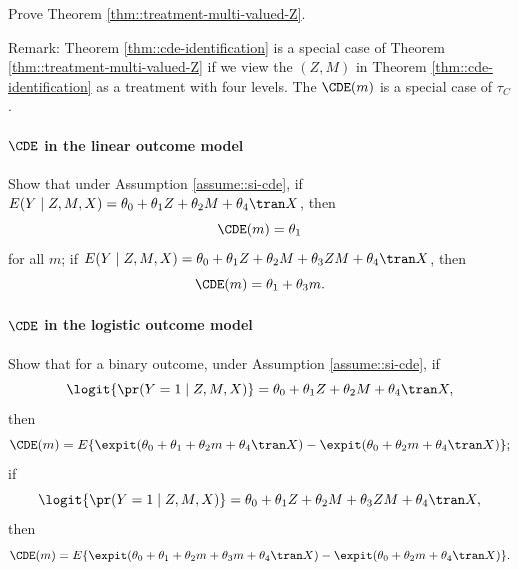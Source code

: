Prove Theorem \ref{thm::treatment-multi-valued-Z}.


Remark: Theorem \ref{thm::cde-identification} is a special case of Theorem \ref{thm::treatment-multi-valued-Z} if we view the $(Z,M)$ in Theorem \ref{thm::cde-identification} as a treatment with four levels. The $  \CDE (m) $ is a special case of $\tau_C $. 


  
  \paragraph{$\CDE$ in the linear outcome model}\label{problem::cde-linear}
  
  Show that under Assumption \ref{assume::si-cde}, if $E(Y\mid Z, M, X ) = \theta_0 + \theta_1 Z + \theta_2 M +   \theta_4\tran X$, then
  $$
  \CDE (m) = \theta_1
  $$
  for all $m$;
  if $E(Y\mid Z, M, X ) = \theta_0 + \theta_1 Z + \theta_2 M + \theta_3 ZM +    \theta_4\tran X$, then
  $$
\CDE(m) =   \theta_1 + \theta_3 m. 
  $$
  
  
    \paragraph{$\CDE$ in the logistic outcome model}\label{problem::cde-logit}
  
  Show that for a binary outcome, under Assumption \ref{assume::si-cde}, if 
  $$
  \logit \{ \pr(Y = 1\mid Z, M, X ) \} = \theta_0 + \theta_1 Z + \theta_2 M +   \theta_4\tran X ,
  $$ 
  then
  $$
  \CDE (m) = E\{ \expit( \theta_0 + \theta_1  + \theta_2 m +   \theta_4\tran X ) - \expit( \theta_0    + \theta_2 m +   \theta_4\tran X ) \} ; 
  $$
  if 
  $$
  \logit \{ \pr(Y = 1\mid Z, M, X ) \} = \theta_0 + \theta_1 Z + \theta_2 M + \theta_3 ZM +    \theta_4\tran X,
  $$ 
  then
  $$
\CDE(m) =  E\{ \expit( \theta_0 + \theta_1  + \theta_2 m  +\theta_3 m +   \theta_4\tran X ) - \expit( \theta_0    + \theta_2 m +   \theta_4\tran X ) \}.
  $$
  
  
  
   

